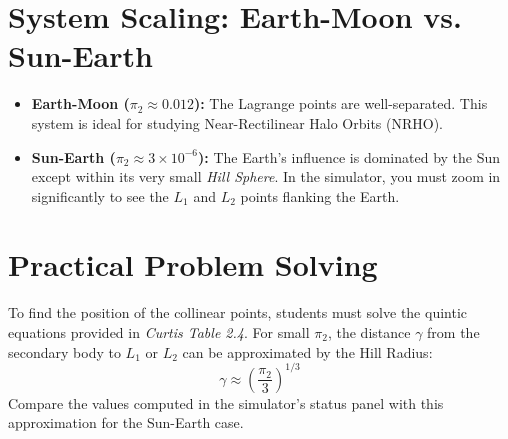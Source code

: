 \documentclass[11pt, a4paper]{article}
\begin{document}
\section{System Scaling: Earth-Moon vs. Sun-Earth}
\begin{itemize}
    \item \textbf{Earth-Moon ($\pi_2 \approx 0.012$):} The Lagrange points are well-separated. This system is ideal for studying Near-Rectilinear Halo Orbits (NRHO).
    \item \textbf{Sun-Earth ($\pi_2 \approx 3 \times 10^{-6}$):} The Earth's influence is dominated by the Sun except within its very small \textit{Hill Sphere}. In the simulator, you must zoom in significantly to see the $L_1$ and $L_2$ points flanking the Earth.
\end{itemize}

\section{Practical Problem Solving}
To find the position of the collinear points, students must solve the quintic equations provided in \textit{Curtis Table 2.4}. For small $\pi_2$, the distance $\gamma$ from the secondary body to $L_1$ or $L_2$ can be approximated by the Hill Radius:
\begin{equation}
    \gamma \approx \left( \frac{\pi_2}{3} \right)^{1/3}
\end{equation}
Compare the values computed in the simulator's status panel with this approximation for the Sun-Earth case.
\end{document}
